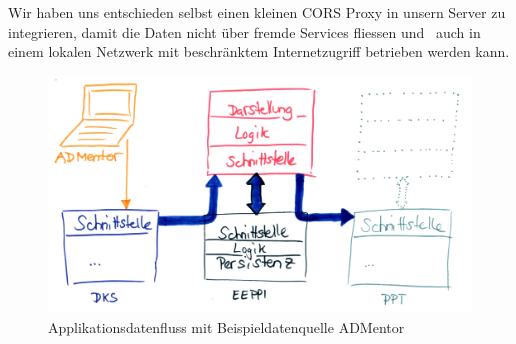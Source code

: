 		Wir haben uns entschieden selbst einen kleinen CORS Proxy in unsern Server zu integrieren,
		damit die Daten nicht über fremde Services fliessen und
		\eeppi\ auch in einem lokalen Netzwerk mit beschränktem Internetzugriff betrieben werden kann.
	
	\begin{figure}[H]
		\includegraphics[width=\textwidth]{architecture/media/img/eeppiDataflow.jpg}
		\centering
		\caption{Applikationsdatenfluss mit Beispieldatenquelle ADMentor}
		\label{fig:applicationDataFlow}
	\end{figure}		